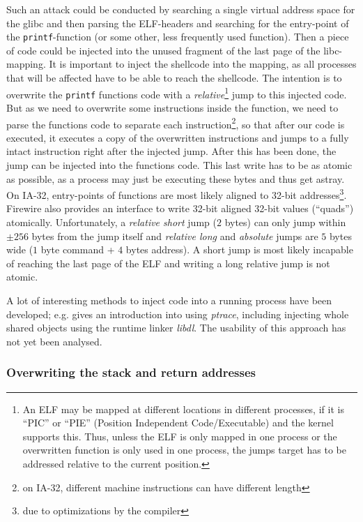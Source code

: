 Such an attack could be conducted by searching a single virtual address space
for the glibc and then parsing the ELF-headers and searching for the entry-point
of the \texttt{printf}-function (or some other, less frequently used function).
Then a piece of code could be injected into the unused fragment of the last page
of the libc-mapping. It is important to inject the shellcode into the mapping,
as all processes that will be affected have to be able to reach the shellcode.
The intention is to overwrite the \texttt{printf} functions code with a
\emph{relative}\footnote{An ELF may be mapped at different locations in
different processes, if it is ``PIC'' or ``PIE'' (Position Independent
Code/Executable) and the kernel supports this. Thus, unless the ELF is only
mapped in one process or the overwritten function is only used in one process,
the jumps target has to be addressed relative to the current position.} jump to
this injected code. But as we need to overwrite some instructions inside the
function, we need to parse the functions code to separate each
instruction\footnote{on IA-32, different machine instructions can have different
length}, so that after our code is executed, it executes a copy of the
overwritten instructions and jumps to a fully intact instruction right after the
injected jump. After this has been done, the jump can be injected into the
functions code. This last write has to be as atomic as possible, as a process
may just be executing these bytes and thus get astray. On IA-32, entry-points of
functions are most likely aligned to 32-bit addresses\footnote{due to
optimizations by the compiler}. Firewire also provides an interface to write
32-bit aligned 32-bit values (``quads'') atomically. Unfortunately, a
\emph{relative short} jump ($2$ bytes) can only jump within $\pm256$ bytes from
the jump itself and \emph{relative long} and \emph{absolute} jumps are $5$ bytes
wide ($1$ byte command + $4$ bytes address). A short jump is most likely
incapable of reaching the last page of the ELF and writing a long relative jump
is not atomic.

A lot of interesting methods to inject code into a running process have been
developed; e.g\@. \cite{phrack59.8:2002} gives an introduction into using
\emph{ptrace}, including injecting whole shared objects using the runtime linker
\emph{libdl}. The usability of this approach has not yet been analysed.


\subsubsection{Overwriting the stack and return addresses}

